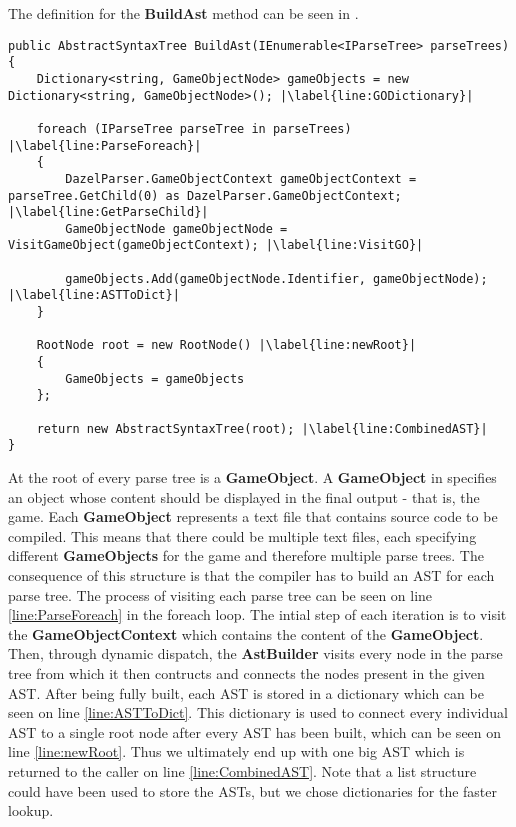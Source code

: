 The definition for the \textbf{BuildAst} method can be seen in .

\begin{lstlisting}[language=CSharp, caption={The BuildAst method}, label={lst:BuildAstMethod},escapechar=|]
public AbstractSyntaxTree BuildAst(IEnumerable<IParseTree> parseTrees)
{
    Dictionary<string, GameObjectNode> gameObjects = new Dictionary<string, GameObjectNode>(); |\label{line:GODictionary}|
    
    foreach (IParseTree parseTree in parseTrees) |\label{line:ParseForeach}|
    {
        DazelParser.GameObjectContext gameObjectContext = parseTree.GetChild(0) as DazelParser.GameObjectContext; |\label{line:GetParseChild}|
        GameObjectNode gameObjectNode = VisitGameObject(gameObjectContext); |\label{line:VisitGO}|
        
        gameObjects.Add(gameObjectNode.Identifier, gameObjectNode); |\label{line:ASTToDict}|
    }

    RootNode root = new RootNode() |\label{line:newRoot}|
    {
        GameObjects = gameObjects
    };
    
    return new AbstractSyntaxTree(root); |\label{line:CombinedAST}|
}
\end{lstlisting}

At the root of every parse tree is a \textbf{GameObject}. A \textbf{GameObject} in \dazel{} specifies an object whose content should be displayed in the final output - that is, the game. Each \textbf{GameObject} represents a text file that contains source code to be compiled. This means that there could be multiple text files, each specifying different \textbf{GameObjects} for the game and therefore multiple parse trees. 
The consequence of this structure is that the compiler has to build an AST for each parse tree. The process of visiting each parse tree can be seen on line \ref{line:ParseForeach} in the foreach loop. 
The intial step of each iteration is to visit the \textbf{GameObjectContext} which contains the content of the \textbf{GameObject}.
Then, through dynamic dispatch, the \textbf{AstBuilder} visits every node in the parse tree from which it then contructs and connects the nodes present in the given AST.
After being fully built, each AST is stored in a dictionary which can be seen on line \ref{line:ASTToDict}. 
This dictionary is used to connect every individual AST to a single root node after every AST has been built, which can be seen on line \ref{line:newRoot}. Thus we ultimately end up with one big AST which is returned to the caller on line \ref{line:CombinedAST}. Note that a list structure could have been used to store the ASTs, but we chose dictionaries for the faster lookup.
 
